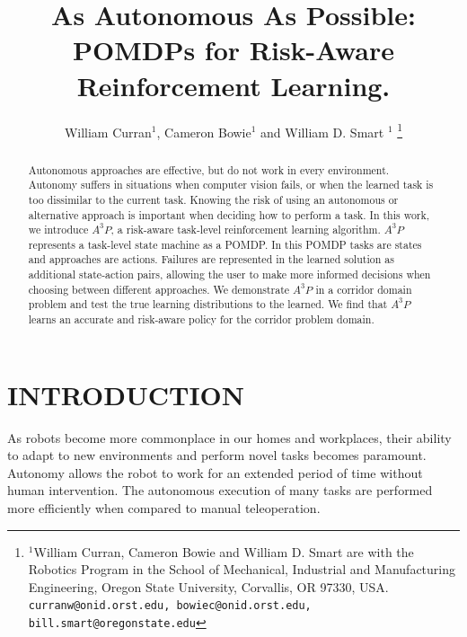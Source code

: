 \documentclass[letterpaper, 10 pt, conference]{ieeeconf}  %
\title{\LARGE \bf
As Autonomous As Possible: POMDPs for Risk-Aware Reinforcement Learning.
}
\author{William Curran$^{1}$, Cameron Bowie$^{1}$ and William D. Smart $^{1}$%
\thanks{$^{1}$William Curran, Cameron Bowie and William D. Smart are with the Robotics Program in the School of Mechanical, Industrial and Manufacturing Engineering, Oregon State University, Corvallis, OR 97330, USA.
{\tt\small curranw@onid.orst.edu, bowiec@onid.orst.edu, bill.smart@oregonstate.edu}}%
}
\begin{document}
\maketitle
\thispagestyle{empty}
\pagestyle{empty}


\begin{abstract}


Autonomous approaches are effective, but do not work in every environment. Autonomy suffers in situations when computer vision fails, or when the learned task is too dissimilar to the current task. Knowing the risk of using an autonomous or alternative approach is important when deciding how to perform a task. In this work, we introduce $A^3P$, a risk-aware task-level reinforcement learning algorithm. $A^3P$ represents a task-level state machine as a POMDP. In this POMDP tasks are states and approaches are actions. Failures are represented in the learned solution as additional state-action pairs, allowing the user to make more informed decisions when choosing between different approaches. We demonstrate $A^3P$ in a corridor domain problem and test the true learning distributions to the learned. We find that $A^3P$ learns an accurate and risk-aware policy for the corridor problem domain.
\end{abstract}

 
\section{INTRODUCTION}

As robots become more commonplace in our homes and workplaces, their ability to adapt to new environments and perform novel tasks becomes paramount. Autonomy allows the robot to work for an extended period of time without human intervention. The autonomous execution of many tasks are performed more efficiently when compared to manual teleoperation. 
\end{document}
